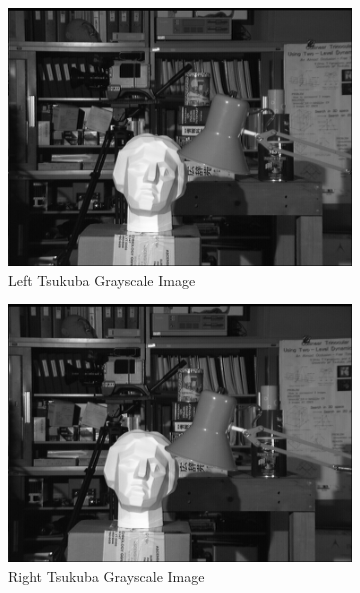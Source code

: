 \begin{figure}
\begin{center}
	\begin{subfigure}{0.45\textwidth}
		\includegraphics[width=\textwidth]{figures/tsukubaL.jpg}
		\caption{Left Tsukuba Grayscale Image}
		\label{fig:tsukubaL}
	\end{subfigure}
	\begin{subfigure}{0.45\textwidth}
		\includegraphics[width=\textwidth]{figures/tsukubaR.jpg}
		\caption{Right Tsukuba Grayscale Image}
		\label{fig:tsukubaR}
	\end{subfigure}
	\\
	\begin{subfigure}{0.45\textwidth}

\end{subfigure}
\end{center}
\end{figure}
